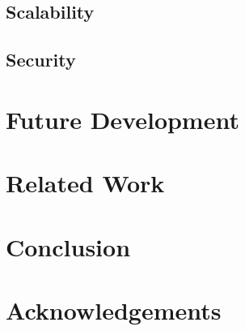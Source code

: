 \documentclass{sig-alternate}
\begin{document}
\subsection{Scalability}

\subsection{Security}

\section{Future Development}

\section{Related Work}

\section{Conclusion}

\section{Acknowledgements}

\nocite{*}


\end{document}
